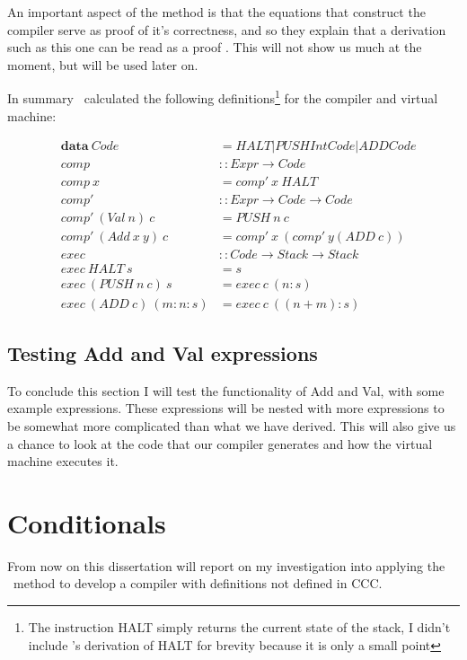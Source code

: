 \documentclass {article}
\begin{document}
An important aspect of the \BH method
is that the equations that construct the 
compiler serve as proof of it's correctness,
and so they explain that a derivation such as
this one can be read as a proof \cite[page 14]{bandh}.
This will not show us much at the moment,
but will be used later on.

In summary \BH\ calculated the following definitions\footnote{
The instruction HALT simply returns the current state of the stack,
I didn't include \BH's derivation of HALT for brevity because
it is only a small point}
for the compiler and virtual machine:

\begin{eqnarray*}
	&\textbf{data} \ Code &= HALT | PUSH Int Code | ADD Code \\
	&comp &:: Expr \rightarrow Code \\
	&comp \ x &= comp' \ x \ HALT \\
	&comp' &:: Expr \rightarrow Code \rightarrow Code \\
	&comp' \ (Val \ n) \ c &= PUSH \ n \ c \\
	&comp' \ (Add \ x \ y) \ c &= comp' \ x \ (comp' \ y (ADD \ c)) \\
	&exec &:: Code  \rightarrow Stack \rightarrow Stack \\
	&exec \ HALT \ s &= s \\
	&exec \ (PUSH \ n \ c) \ s &= exec \ c \ (n:s) \\
	&exec \ (ADD \ c) \ (m:n:s) &= exec \ c \ ((n + m):s)
\end{eqnarray*}

\subsection{Testing Add and Val expressions}

To conclude this section I will test the functionality
of Add and Val, with some example expressions.
These expressions will be nested with more expressions
to be somewhat more complicated than what we have derived.
This will also give us a chance to look at the code that our
compiler generates and how the virtual machine executes it.


\section{Conditionals}

From now on this dissertation will report on my
investigation into applying the \BH\ method to develop a compiler
with definitions not defined in CCC.
\end{document}
